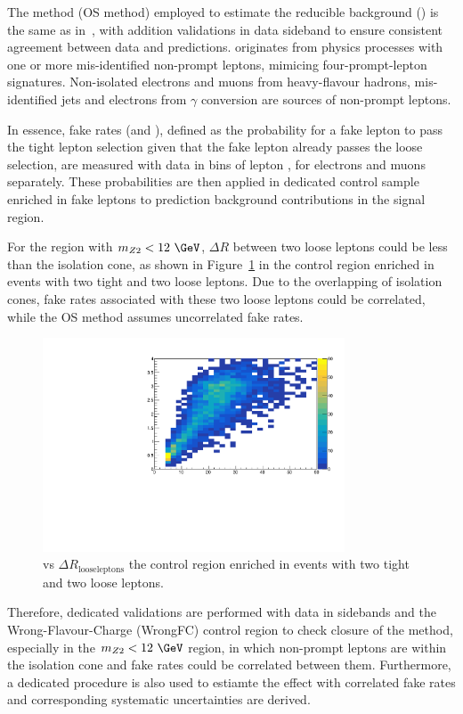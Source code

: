 The method (OS method) employed to estimate the reducible background (\zx) is the same as in~\cite{AN-16-442,AN-17-342}, with 
addition validations in data sideband to ensure consistent agreement between data and \zx predictions.
\zx originates from physics processes with one or more mis-identified non-prompt 
leptons, mimicing four-prompt-lepton signatures. Non-isolated electrons and muons from heavy-flavour hadrons, 
mis-identified jets and electrons from $\gamma$ conversion are sources of non-prompt leptons.

In essence, fake rates (\frEl and \frMu), defined as the probability for a fake lepton to pass the tight 
lepton selection given that the fake lepton already passes the loose selection, are measured with data in 
bins of lepton \pt, for electrons and muons separately. These probabilities are then applied in dedicated 
control sample enriched in fake leptons to prediction background contributions in the signal region.

For the region with $\mass{Z2} < 12~\GeV$, $\Delta R$ between two loose leptons could be less than the isolation cone, 
as shown in Figure~\ref{fig:mZ2_DeltaR34_Data16} in the control region enriched in events with two tight and two loose leptons. 
Due to the overlapping of isolation cones, fake rates associated with these two loose leptons could be correlated, 
while the OS method assumes uncorrelated fake rates.
\begin{figure}[!htb]
\begin{center}
    \includegraphics[width=0.80\textwidth]{Figures/RedBkg/Data_Run2016_Z2_mass_vs_DeltaR34_2p2f.pdf}
    \caption{
     vs $\Delta R_{\mathrm{loose leptons}}$ the control region enriched in events with two tight and two loose leptons.  
    \label{fig:mZ2_DeltaR34_Data16}
    }
\end{center}
\end{figure}
Therefore, dedicated validations are performed with data in \mass{4\ell} sidebands and the Wrong-Flavour-Charge 
(WrongFC) control region to check closure of the method, especially in the $\mass{Z2} < 12~\GeV$ region, in which 
non-prompt leptons are within the isolation cone and fake rates could be correlated between them. Furthermore, 
a dedicated procedure is also used to estiamte the effect with correlated fake rates and corresponding 
systematic uncertainties are derived.

